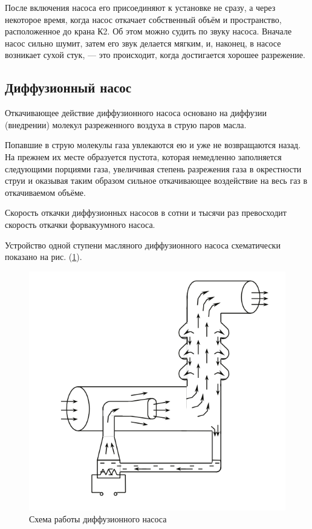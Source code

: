 \documentclass[a4paper,12pt]{article} %
\begin{document}
После включения насоса его присоединяют к установке не сразу, а через некоторое время, когда насос откачает собственный объём и пространство, расположенное до крана К2. Об этом можно судить по звуку насоса. Вначале насос сильно шумит, затем его звук делается мягким, и, наконец, в насосе возникает сухой стук, — это происходит, когда достигается хорошее разрежение.

\subsection*{Диффузионный насос}

Откачивающее действие диффузионного насоса основано на диффузии (внедрении) молекул разреженного воздуха в струю паров масла. 

Попавшие в струю молекулы газа увлекаются ею и уже не возвращаются назад. На прежнем их месте образуется пустота, которая немедленно заполняется следующими порциями газа, увеличивая степень разрежения газа в окрестности струи и оказывая таким образом сильное откачивающее воздействие на весь газ в откачиваемом объёме. 

Скорость откачки диффузионных насосов в сотни и тысячи раз превосходит скорость откачки форвакуумного насоса.

Устройство одной ступени масляного диффузионного насоса схематически показано на рис. (\ref{fig:diffusion_pump}).

\begin{figure}[h]
  \centering
  \includegraphics[scale = 0.75]{diffusion_pump.png}
  \caption{Схема работы диффузионного насоса}
  \label{fig:diffusion_pump}
\end{figure}
\end{document}

